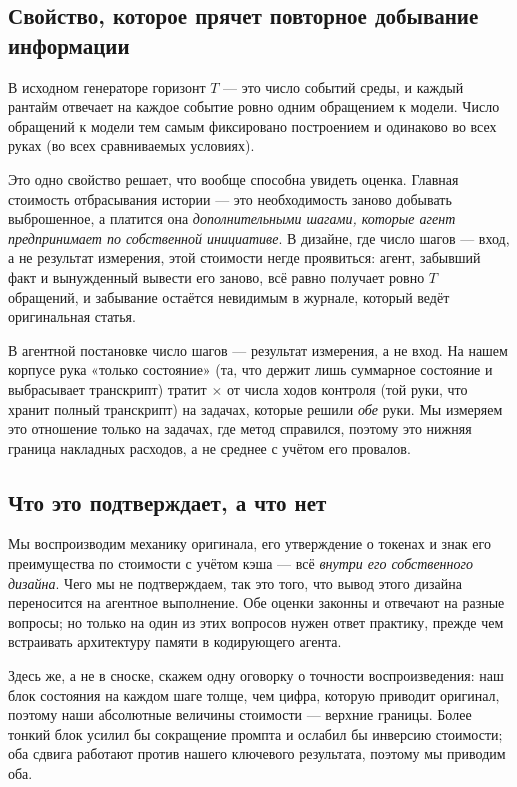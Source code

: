 \subsection{Свойство, которое прячет повторное добывание информации}

В исходном генераторе горизонт $T$ — это число событий среды, и каждый
рантайм отвечает на каждое событие ровно одним обращением к модели\origin.
Число обращений к модели тем самым фиксировано построением и одинаково во
всех руках (во всех сравниваемых условиях).

Это одно свойство решает, что вообще способна увидеть оценка. Главная
стоимость отбрасывания истории — это необходимость заново добывать
выброшенное, а платится она \emph{дополнительными шагами, которые агент
предпринимает по собственной инициативе}. В дизайне, где число шагов —
вход, а не результат измерения, этой стоимости негде проявиться: агент,
забывший факт и вынужденный вывести его заново, всё равно получает ровно
$T$ обращений, и забывание остаётся невидимым в журнале, который ведёт
оригинальная статья.

В агентной постановке число шагов — результат измерения, а не вход. На
нашем корпусе рука «только состояние» (та, что держит лишь суммарное
состояние и выбрасывает транскрипт) тратит \TurnRatioTailZero$\times$ от
числа ходов контроля (той руки, что хранит полный транскрипт) на задачах,
 которые решили \emph{обе} руки\live. Мы измеряем это отношение только на
задачах, где метод справился, поэтому это нижняя граница накладных
расходов, а не среднее с учётом его провалов.

\subsection{Что это подтверждает, а что нет}

Мы воспроизводим механику оригинала, его утверждение о токенах и знак его
преимущества по стоимости с учётом кэша — всё \emph{внутри его собственного
дизайна}. Чего мы не подтверждаем, так это того, что вывод этого дизайна
переносится на агентное выполнение. Обе оценки законны и отвечают на разные
вопросы; но только на один из этих вопросов нужен ответ практику, прежде
чем встраивать архитектуру памяти в кодирующего агента.

Здесь же, а не в сноске, скажем одну оговорку о точности воспроизведения:
наш блок состояния на каждом шаге толще, чем цифра, которую приводит
оригинал\live, поэтому наши абсолютные величины стоимости — верхние
границы. Более тонкий блок усилил бы сокращение промпта и ослабил бы
инверсию стоимости; оба сдвига работают против нашего ключевого результата,
поэтому мы приводим оба.
